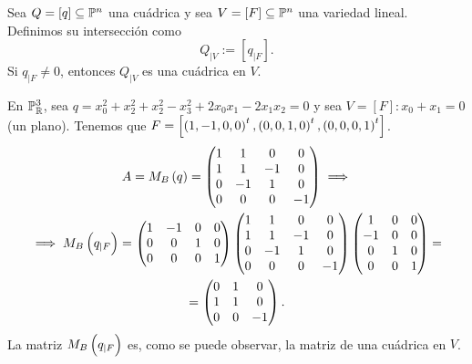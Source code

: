 
\begin{defi}
    Sea $Q= \left[ q \right] \subseteq \mathbb{P} ^n$ una cuádrica y sea $V = \left[ F \right] \subseteq \mathbb{P} ^n$ una variedad lineal. Definimos su intersección como
    \[
        Q_{|V} := \left[q_{|F} \right].
    \]
    Si $q_{|F} \neq 0$, entonces $Q_{|V}$ es una cuádrica en $V$.
\end{defi}

\begin{example}
    En $\mathbb{P} _{\mathbb{R}} ^3$, sea $q=x_0^2+x_2^2+x_2^2-x_3^2+2x_0x_1-2x_1x_2=0$ y sea $V=\left[ F \right] \colon x_0+x_1=0$ (un plano). Tenemos que $F=\left[ \left( 1, -1, 0, 0 \right) ^t, \left( 0, 0, 1, 0 \right) ^t, \left( 0, 0, 0, 1 \right) ^t \right]$.
    \begin{gather*}
        A=M_B\left( q \right) = \begin{pmatrix}
            1 & 1 & 0 & 0 \\
            1 & 1 & -1 & 0 \\
            0 & -1 & 1 & 0 \\
            0 & 0 & 0 & -1
        \end{pmatrix} \implies \\
        \implies M_B \left( q_{|F} \right) = \begin{pmatrix}
            1 & -1 & 0 & 0 \\
            0 & 0 & 1 & 0 \\
            0 & 0 & 0 & 1
        \end{pmatrix} \begin{pmatrix}
            1 & 1 & 0 & 0 \\
            1 & 1 & -1 & 0 \\
            0 & -1 & 1 & 0 \\
            0 & 0 & 0 & -1
        \end{pmatrix} \begin{pmatrix}
            1 & 0 & 0 \\
            -1 & 0 & 0 \\
            0 & 1 & 0 \\
            0 & 0 & 1
        \end{pmatrix} = \\
        = \begin{pmatrix}
            0 & 1 & 0 \\
            1 & 1 & 0 \\
            0 & 0 & -1
        \end{pmatrix}.
    \end{gather*}
    La matriz $M_B \left( q_{|F} \right)$ es, como se puede observar, la matriz de una cuádrica en $V$.
\end{example}

